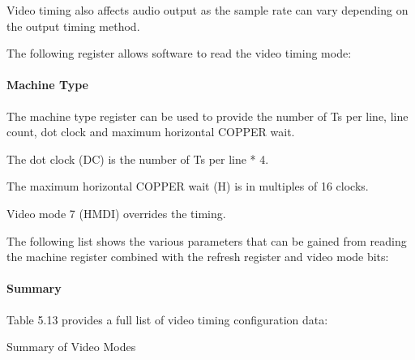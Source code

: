 Video timing also affects audio output as the sample rate can vary
depending on the output timing method.

The following register allows software to read the video timing mode:



\paragraph{Machine Type}

The machine type register can be used to provide the number of Ts per
line, line count, dot clock and maximum horizontal COPPER wait.

The dot clock (DC) is the number of Ts per line * 4.

The maximum horizontal COPPER wait (H) is in multiples of 16 clocks.

Video mode 7 (HMDI) overrides the timing.

The following list shows the various parameters that can be gained
from reading the machine register combined with the refresh register
and video mode bits:


      
\paragraph{Summary}

Table 5.13 provides a full list of video timing configuration
data:

\begin{table}[h]\centering
  \caption{Summary of Video Modes}
\end{table}




